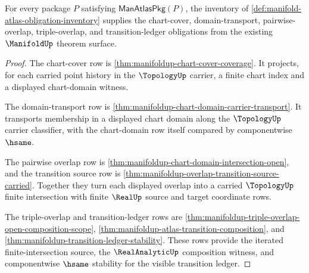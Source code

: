 \begin{theorem}
\label{thm:manifold-atlas-chart-domain-transition-obligation}
For every package $P$ satisfying $\mathsf{ManAtlasPkg}(P)$, the inventory of
\autoref{def:manifold-atlas-obligation-inventory} supplies the chart-cover,
domain-transport, pairwise-overlap, triple-overlap, and transition-ledger
obligations from the existing $\ManifoldUp$ theorem surface.
\end{theorem}
\begin{proof}
The chart-cover row is
\autoref{thm:manifoldup-chart-cover-coverage}. It projects, for each carried
point history in the $\TopologyUp$ carrier, a finite chart index and a
displayed chart-domain witness.

The domain-transport row is
\autoref{thm:manifoldup-chart-domain-carrier-transport}. It transports
membership in a displayed chart domain along the $\TopologyUp$ carrier
classifier, with the chart-domain row itself compared by componentwise
$\hsame$.

The pairwise overlap row is
\autoref{thm:manifoldup-chart-domain-intersection-open}, and the transition
source row is
\autoref{thm:manifoldup-overlap-transition-source-carried}. Together they turn
each displayed overlap into a carried $\TopologyUp$ finite intersection with
finite $\RealUp$ source and target coordinate rows.

The triple-overlap and transition-ledger rows are
\autoref{thm:manifoldup-triple-overlap-open-composition-scope},
\autoref{thm:manifoldup-atlas-transition-composition}, and
\autoref{thm:manifoldup-transition-ledger-stability}. These rows provide the
iterated finite-intersection source, the $\RealAnalyticUp$ composition witness,
and componentwise $\hsame$ stability for the visible transition ledger.
\end{proof}

